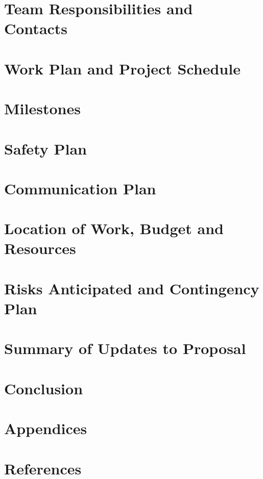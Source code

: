 \documentclass[amsmath, amssymb, pra, aps, 12pt]{revtex4-1}
\begin{document}
\section{\label{sec:responsabilities}Team Responsibilities and Contacts}


\section{\label{sec:schedule}Work Plan and Project Schedule}


\section{\label{sec:milestones}Milestones}


\section{\label{sec:safety-plan}Safety Plan}


\section{\label{sec:communication-plan}Communication Plan}


\section{\label{sec:resources}Location of Work, Budget and Resources}


\section{\label{sec:contingency-plan}Risks Anticipated and Contingency Plan}


\section{\label{sec:update-summary}Summary of Updates to Proposal}


\section{\label{sec:conclusion}Conclusion}


\section{\label{sec:appendices}Appendices}


\section{\label{sec:references}References}

\end{document}
